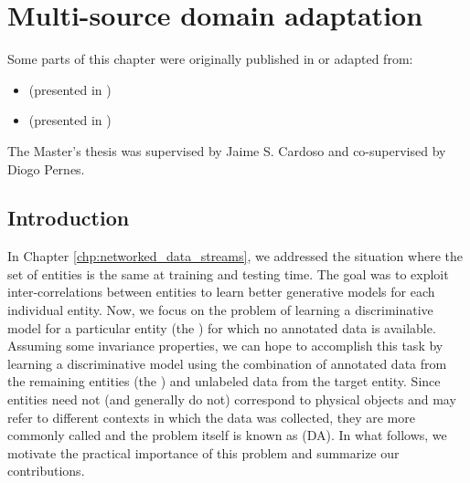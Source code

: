 
\chapter{Multi-source domain adaptation}


\label{chp:domain_adaptation}


\begin{tcolorbox}
    \small{
    Some parts of this chapter were originally published in or adapted from:
    \begin{itemize}
        \item[] \cite{ThesisFrancisco}  (presented in )
        \item[] \cite{MODAFM}  (presented in )
    \end{itemize}

    The Master's thesis \cite{ThesisFrancisco} was supervised by Jaime S. Cardoso and co-supervised by Diogo Pernes.
    }
\end{tcolorbox}

\section{Introduction}
\label{sec:chp3_intro}
In Chapter \ref{chp:networked_data_streams}, we addressed the situation where the set of entities is the same at training and testing time. The goal was to exploit inter-correlations between entities to learn better generative models for each individual entity. Now, we focus on the problem of learning a discriminative model for a particular entity (the ) for which no annotated data is available. Assuming some invariance properties, we can hope to accomplish this task by learning a discriminative model using the combination of annotated data from the remaining entities (the ) and unlabeled data from the target entity. Since entities need not (and generally do not) correspond to physical objects and may refer to different contexts in which the data was collected, they are more commonly called  and the problem itself is known as  (DA). In what follows, we motivate the practical importance of this problem and summarize our contributions.

